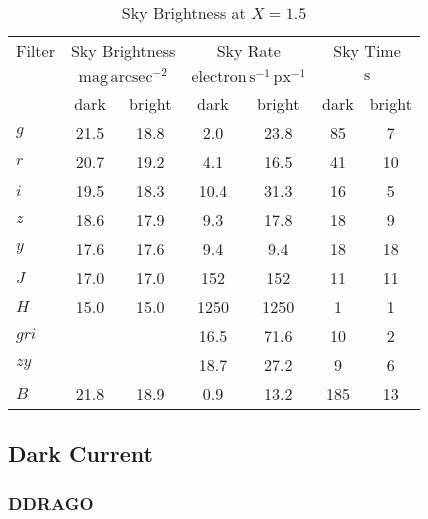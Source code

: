 \documentclass{article}
\begin{document}
\begin{table}
\caption{Sky Brightness at $X = 1.5$}
\label{table:sky-brightness}
\begin{center}
\begin{tabular}{lcccccc}
\hline
\hline
Filter&
\multicolumn{2}{c}{Sky Brightness}&
\multicolumn{2}{c}{Sky Rate}&
\multicolumn{2}{c}{Sky Time}\\
&
\multicolumn{2}{c}{$\mathrm{mag\,arcsec^{-2}}$}&
\multicolumn{2}{c}{$\mathrm{electron\,s^{-1}\,px^{-1}}$}&
\multicolumn{2}{c}{$\mathrm{s}$}\\
&
dark&
bright&
dark&
bright&
dark&
bright\\
\hline
$g$  &21.5&18.8&\phantom{000}2.0\phantom{}&\phantom{00}23.8\phantom{}&\phantom{0}85&\phantom{0}7\\
$r$  &20.7&19.2&\phantom{000}4.1\phantom{}&\phantom{00}16.5\phantom{}&\phantom{0}41&\phantom{}10\\
$i$  &19.5&18.3&\phantom{00}10.4\phantom{}&\phantom{00}31.3\phantom{}&\phantom{0}16&\phantom{0}5\\
$z$  &18.6&17.9&\phantom{000}9.3\phantom{}&\phantom{00}17.8\phantom{}&\phantom{0}18&\phantom{0}9\\
$y$  &17.6&17.6&\phantom{000}9.4\phantom{}&\phantom{000}9.4\phantom{}&\phantom{0}18&\phantom{}18\\
$J$  &17.0&17.0&\phantom{0}152\phantom{.0}&\phantom{0}152\phantom{.0}&\phantom{0}11&\phantom{}11\\
$H$  &15.0&15.0&\phantom{}1250\phantom{.0}&\phantom{}1250\phantom{.0}&\phantom{00}1&\phantom{0}1\\
$gri$&    &    &\phantom{00}16.5\phantom{}&\phantom{00}71.6\phantom{}&\phantom{0}10&\phantom{0}2\\
$zy$ &    &    &\phantom{00}18.7\phantom{}&\phantom{00}27.2\phantom{}&\phantom{00}9&\phantom{0}6\\
$B$  &21.8&18.9&\phantom{000}0.9\phantom{}&\phantom{00}13.2\phantom{}&\phantom{}185&\phantom{}13\\
\hline
\end{tabular}
\end{center}
\end{table}

\subsection{Dark Current}

\subsubsection{DDRAGO}
\end{document}
